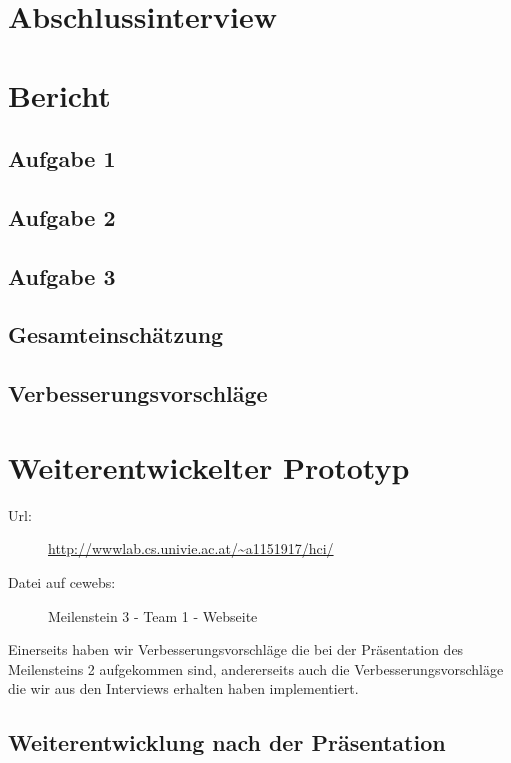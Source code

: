 \documentclass[a4paper,10pt]{scrartcl}
\begin{document}
\section{Abschlussinterview}



\section{Bericht}

\subsection{Aufgabe 1}

\subsection{Aufgabe 2}

\subsection{Aufgabe 3}

\subsection{Gesamteinschätzung}

\subsection{Verbesserungsvorschläge}

\section{Weiterentwickelter Prototyp}

\begin{description}
 \item[Url:] \url{http://wwwlab.cs.univie.ac.at/~a1151917/hci/}
 \item[Datei auf cewebs:]Meilenstein 3 - Team 1 - Webseite
\end{description}

Einerseits haben wir Verbesserungsvorschläge die bei der Präsentation des Meilensteins 2 aufgekommen sind, andererseits auch
die Verbesserungsvorschläge die wir aus den Interviews erhalten haben implementiert.

\subsection{Weiterentwicklung nach der Präsentation}
\end{document}
